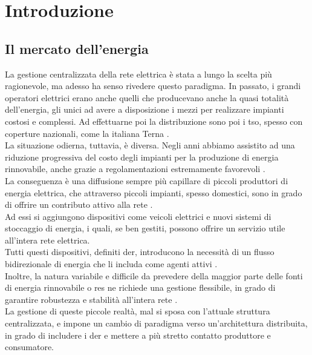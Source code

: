 \chapter{Introduzione}

\section{Il mercato dell'energia}
La gestione centralizzata della rete elettrica è stata a lungo la scelta più ragionevole, ma adesso ha senso rivedere questo paradigma.
In passato, i grandi operatori elettrici erano anche quelli che producevano anche la quasi totalità dell'energia, gli unici ad avere a disposizione i mezzi per realizzare impianti costosi e complessi.
Ad effettuarne poi la distribuzione sono poi i \gls{tso}, spesso con coperture nazionali, come la italiana Terna \cite{art:terna-role}. \\
La situazione odierna, tuttavia, è diversa.
Negli anni abbiamo assistito ad una riduzione progressiva del costo degli impianti per la produzione di energia rinnovabile, 
anche grazie a regolamentazioni estremamente favorevoli \cite{art:renewable-energy-regulations}. \\
La conseguenza è una diffusione sempre più capillare di piccoli produttori di energia elettrica, 
che attraverso piccoli impianti, spesso domestici, sono in grado di offrire un contributo attivo alla rete \cite{art:renewable-energy-increment}. \\
Ad essi si aggiungono dispositivi come veicoli elettrici e nuovi sistemi di stoccaggio di energia, i quali, se ben gestiti, 
possono offrire un servizio utile all'intera rete elettrica. \\
Tutti questi dispositivi, definiti \gls{der}, introducono la necessità di un flusso bidirezionale di energia che li includa come agenti attivi \cite{art:enel-der}. \\
Inoltre, la natura variabile e difficile da prevedere della maggior parte delle fonti di energia rinnovabile o \gls{res} ne richiede una gestione flessibile, 
in grado di garantire robustezza e stabilità all'intera rete \cite{art:blockchain-der}. \\

La gestione di queste piccole realtà, mal si sposa con l'attuale struttura centralizzata, e impone un cambio di paradigma verso un'architettura distribuita, 
in grado di includere i \gls{der} e mettere a più stretto contatto produttore e consumatore.

